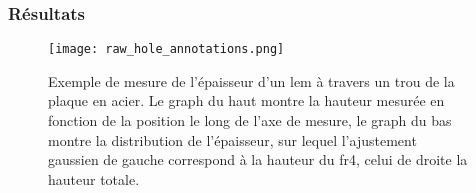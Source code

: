             \subsubsection{Résultats}\label{sec::thickness_result}
                
                \begin{figure}[htpb]
                    \texttt{[image: raw\_hole\_annotations.png]}
                    \caption[Exemple de mesure de l'épaisseur d'un \gls{lem} mesurée à travers un trou de la plaque en acier.]{Exemple de mesure de l'épaisseur d'un \gls{lem} à travers un trou de la plaque en acier. Le graph du haut montre la hauteur mesurée en fonction de la position le long de l'axe de mesure, le graph du bas montre la distribution de l'épaisseur, sur lequel l'ajustement gaussien de gauche correspond à la hauteur du \gls{fr4}, celui de droite la hauteur totale.}
                    \label{fig::distri_1_trou_lem}
                \end{figure}
                    
